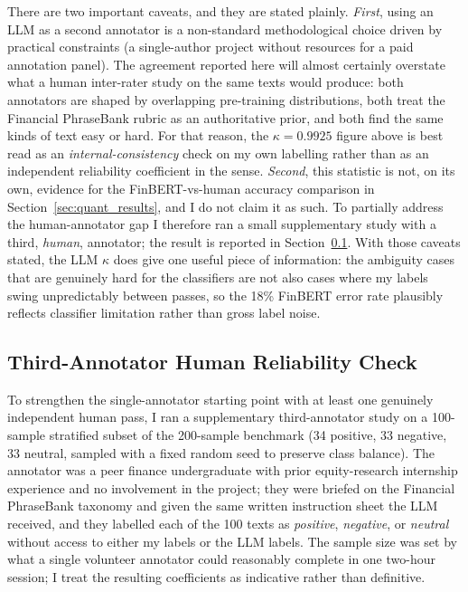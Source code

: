 There are two important caveats, and they are stated plainly. \emph{First}, using an LLM as a second annotator is a non-standard methodological choice driven by practical constraints (a single-author project without resources for a paid annotation panel). The agreement reported here will almost certainly overstate what a human inter-rater study on the same texts would produce: both annotators are shaped by overlapping pre-training distributions, both treat the Financial PhraseBank rubric as an authoritative prior, and both find the same kinds of text easy or hard. For that reason, the $\kappa = 0.9925$ figure above is best read as an \emph{internal-consistency} check on my own labelling rather than as an independent reliability coefficient in the \citet{landis1977measurement} sense. \emph{Second}, this statistic is not, on its own, evidence for the FinBERT-vs-human accuracy comparison in Section~\ref{sec:quant_results}, and I do not claim it as such. To partially address the human-annotator gap I therefore ran a small supplementary study with a third, \emph{human}, annotator; the result is reported in Section~\ref{sec:human_annotator}. With those caveats stated, the LLM $\kappa$ does give one useful piece of information: the ambiguity cases that are genuinely hard for the classifiers are not also cases where my labels swing unpredictably between passes, so the 18\% FinBERT error rate plausibly reflects classifier limitation rather than gross label noise.

\subsection{Third-Annotator Human Reliability Check}
\label{sec:human_annotator}

To strengthen the single-annotator starting point with at least one genuinely independent human pass, I ran a supplementary third-annotator study on a 100-sample stratified subset of the 200-sample benchmark (34 positive, 33 negative, 33 neutral, sampled with a fixed random seed to preserve class balance). The annotator was a peer finance undergraduate with prior equity-research internship experience and no involvement in the project; they were briefed on the Financial PhraseBank taxonomy and given the same written instruction sheet the LLM received, and they labelled each of the 100 texts as \textit{positive}, \textit{negative}, or \textit{neutral} without access to either my labels or the LLM labels. The sample size was set by what a single volunteer annotator could reasonably complete in one two-hour session; I treat the resulting coefficients as indicative rather than definitive.

